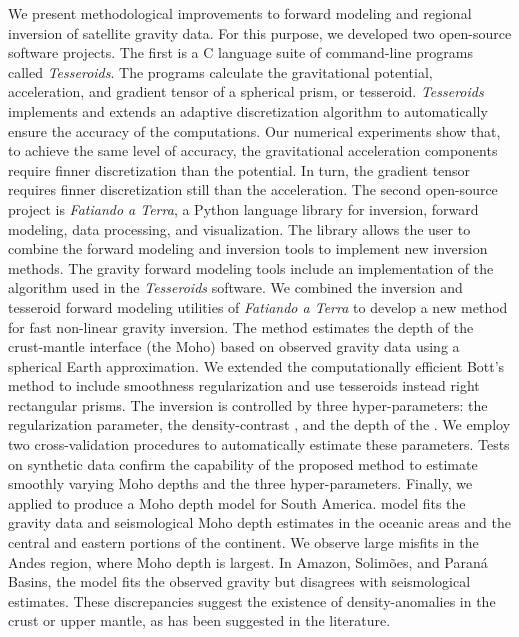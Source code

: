 \begin{foreignabstract}

We present methodological improvements to forward modeling and regional
inversion of satellite gravity data.
For this purpose, we developed two open-source software projects.
The first is a C language suite of command-line programs called
\textit{Tesseroids}.
The programs calculate the gravitational potential, acceleration, and gradient
tensor of a spherical prism, or tesseroid.
\textit{Tesseroids} implements and extends an adaptive discretization algorithm
to automatically ensure the accuracy of the computations.
Our numerical experiments show that, to achieve the same level of accuracy, the
gravitational acceleration components require finner discretization than the
potential.
In turn, the gradient tensor requires finner discretization still than the
acceleration.
The second open-source project is \textit{Fatiando a Terra}, a Python language
library for inversion, forward modeling, data processing, and visualization.
The library allows the user to combine the forward modeling and inversion tools
to implement new inversion methods.
The gravity forward modeling tools include an implementation of the
algorithm used in the \textit{Tesseroids} software.
We combined the inversion and tesseroid forward modeling utilities of
\textit{Fatiando a Terra} to develop a new method for fast non-linear gravity
inversion.
The method estimates the depth of the crust-mantle interface (the Moho) based
on observed gravity data using a spherical Earth approximation.
We extended the computationally efficient Bott's method to include smoothness
regularization and use tesseroids instead right rectangular prisms.
The inversion is controlled by three hyper-parameters: the regularization
parameter, the \DIFdelbegin {}\DIFdelend density-contrast \DIFaddbegin {}\DIFaddend , and the depth of the \DIFdelbegin {}\DIFdelend \DIFaddbegin {}\DIFaddend .
We employ two cross-validation procedures to automatically estimate these
parameters.
Tests on synthetic data confirm the capability of the proposed method to
estimate smoothly varying Moho depths and the three hyper-parameters.
Finally, we applied \DIFdelbegin {}\DIFdelend \DIFaddbegin {}\DIFaddend to produce a Moho depth
model for South America.
\DIFdelbegin {}\DIFdelend \DIFaddbegin {}\DIFaddend model fits the gravity data and seismological Moho
depth estimates in the oceanic areas and the central and eastern portions of
the continent.
We observe large misfits in the Andes region, where Moho depth is largest.
In Amazon, Solimões, and Paraná Basins, the model fits the observed gravity
but disagrees with seismological estimates.
These discrepancies suggest the existence of density-anomalies in the crust or
upper mantle, as has been suggested in the literature.
\end{foreignabstract}
